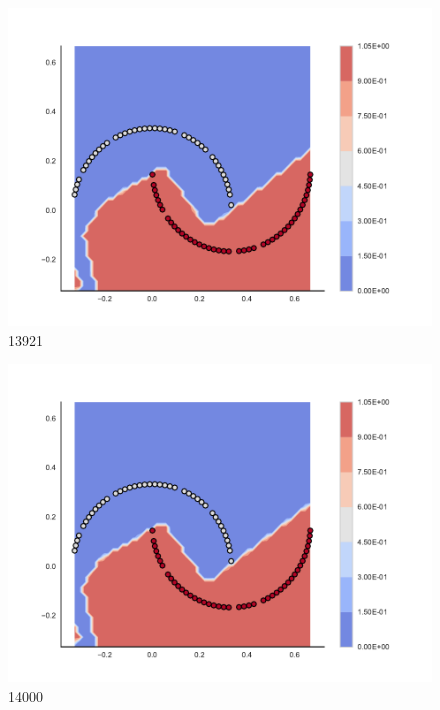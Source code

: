 \begin{subfigure}[b]{0.09\textwidth}
    \includegraphics[clip, trim=2.35cm 1.75cm 4.5cm 0cm,width=\textwidth]{img/convergence/13921.pdf}
    \caption{13921}
    \label{fig:convergence_13921}
\end{subfigure}
%
\begin{subfigure}[b]{0.09\textwidth}
    \includegraphics[clip, trim=2.35cm 1.75cm 4.5cm 0cm,width=\textwidth]{img/convergence/14000.pdf}
    \caption{14000}
    \label{fig:convergence_14000}
\end{subfigure}
%
